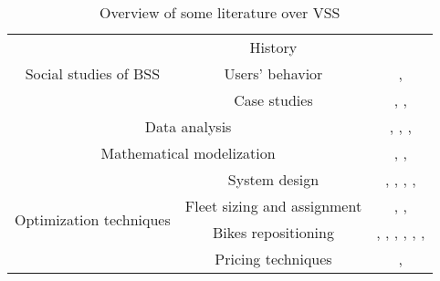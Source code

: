 \begin{table}
\centering
\begin{tabular}{||c|c|c||}
\hline
\hline
\multirow{3}{*}{Social studies of BSS} & History & \cite{DeMaio2009}\\ 
\cline{2-3}
&
 Users' behavior & \begin{minipage}{0.4\textwidth}\cite{Froehlich2008}, \cite{Shaheen2010}\end{minipage}\\
\cline{2-3}
&
 Case studies & \begin{minipage}{0.4\textwidth}\cite{Shaheen2007}, \cite{Shaheen2011}, \cite{Correia2014}\end{minipage}\\
\hline
\hline
\multicolumn{2}{||c|}{Data analysis} &  \begin{minipage}{0.4\textwidth}\cite{Froehlich2008}, \cite{Borgnat2011}, \cite{Nair2013}, \cite{Frade2014}\end{minipage}\\
\hline
\hline
\multicolumn{2}{||c|}{Mathematical modelization} & \begin{minipage}{0.4\textwidth}\cite{Shu2005}, \cite{Fricker2012}, \cite{Fricker2014}\end{minipage}\\ 
\hline
\hline
\multirow{4}{*}{Optimization techniques} & System design &\begin{minipage}{0.4\textwidth}\cite{Campbell1992}, \cite{Katzev2003}, \cite{DeMaio2004}, \cite{Borndorfer2007}, \cite{Correia2012}\end{minipage}\\ 
\cline{2-3}
&
 Fleet sizing and assignment & \begin{minipage}{0.4\textwidth}\cite{George2011}, \cite{Raviv2013a}, \cite{Shu2013}\end{minipage}\\
\cline{2-3}
&
 Bikes repositioning & \begin{minipage}{0.4\textwidth}\cite{Kek2009}, \cite{Benchimol2011}, \cite{Chemla2012}, \cite{Contardo2012}, \cite{Raviv2013b}, \cite{Schuijbroeck2013}, \cite{Angeloudis2014}\end{minipage}\\
\cline{2-3}
&
 Pricing techniques 
& \begin{minipage}{0.4\textwidth}\cite{Waserhole2012}, \cite{Waserhole2013}\end{minipage}\\
\hline
\hline
\end{tabular}
\caption{Overview of some literature over VSS}
\label{table:LitRev}
\end{table}

